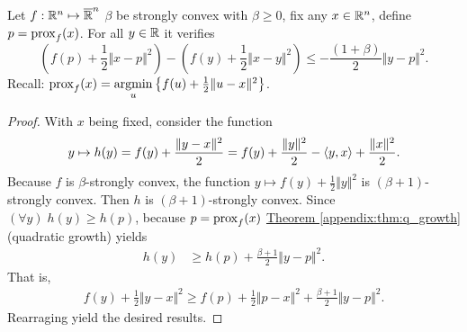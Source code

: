 \documentclass[12pt]{article}
\begin{document}
    \begin{theorem}
    \label{appendix:proof_ppm_descent_lemma}
        Let $f: \mathbb R^n \mapsto \overline {\mathbb R}^n$ $\beta$ be strongly convex with $\beta \ge 0$, fix any $x \in \mathbb R^n$, define $p = \operatorname{prox}_f(x)$.
        For all $y \in \mathbb R$ it verifies
        $$
            \left(f(p) + \frac{1}{2}\Vert x - p\Vert^2\right)
            - 
            \left(
                f(y) + \frac{1}{2}\Vert x - y\Vert^2 
            \right)
            \le 
            - \frac{(1 + \beta)}{2}\Vert y - p\Vert^2. 
        $$
        Recall: $\operatorname{prox}_f(x) = \mathop{\rm argmin}\limits_{u}\left\lbrace f(u) + \frac{1}{2}\Vert u - x\Vert^2 \right\rbrace$. 
    \end{theorem}
    \begin{proof}
        With $x$ being fixed,
        consider the function
        $$
            y\mapsto h(y)=f(y)+\frac{\|y-x\|^2}{2}=f(y)+\frac{\|y\|^2}{2}-\langle{{y},{x}}\rangle+\frac{\|x\|^2}{2}.
        $$
        Because $f$ is $\beta$-strongly convex, the function
        $y\mapsto f(y) + \frac{1}{2}\Vert y\Vert^2$ is $(\beta + 1)$-strongly convex.
        Then $h$ is $(\beta + 1)$-strongly convex.
        Since $(\forall y)\; h(y) \ge h(p)$, because $p = \operatorname{prox}_f(x)$ 
        \hyperref[appendix:thm:q_growth]{Theorem \ref*{appendix:thm:q_growth}}
        (quadratic growth)
        yields
        \begin{align*}
            h(y) &\ge
            h(p) + \frac{\beta + 1}{2}\Vert y - p\Vert^2.
        \end{align*}
        That is,
        \begin{align*}
            f(y) + \frac{1}{2}\Vert y - x\Vert^2
            \ge
            f(p) + \frac{1}{2} \Vert p - x\Vert^2
            + \frac{\beta + 1}{2}\Vert y - p\Vert^2.
        \end{align*}
        Rearraging yield the desired results. 
    \end{proof}





\end{document}
